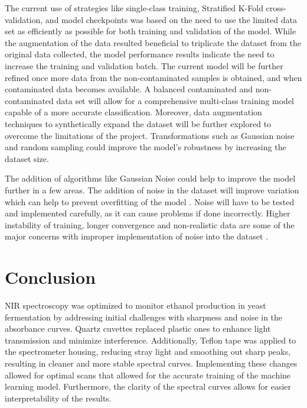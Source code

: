 \documentclass[final, 3p, 11pt]{elsarticle}
\begin{document}
The current use of strategies like single-class training, Stratified K-Fold cross-validation, and model checkpoints was based on the need to use the limited data set as efficiently as possible for both training and validation of the model. While the augmentation of the data resulted beneficial to triplicate the dataset from the original data collected, the model performance results indicate the need to increase the training and validation batch. The current model will be further refined once more data from the non-contaminated samples is obtained, and when contaminated data becomes available. A balanced contaminated and non-contaminated data set will allow for a comprehensive multi-class training model capable of a more accurate classification. Moreover, data augmentation techniques to synthetically expand the dataset will be further explored to overcome the limitations of the project. Transformations such as Gaussian noise and random sampling could improve the model’s robustness by increasing the dataset size.

The addition of algorithms like Gaussian Noise could help to improve the model further in a few areas. The addition of noise in the dataset will improve variation which can help to prevent overfitting of the model \citep{yeImprovingMachineLearning2023}. Noise will have to be tested and implemented carefully, as it can cause problems if done incorrectly. Higher instability of training, longer convergence and non-realistic data are some of the major concerns with improper implementation of noise into the dataset \citep{kuskEffectGaussianNoise2023}.


\section{Conclusion}
NIR spectroscopy was optimized to monitor ethanol production in yeast fermentation by addressing initial challenges with sharpness and noise in the absorbance curves. Quartz cuvettes replaced plastic ones to enhance light transmission and minimize interference. Additionally, Teflon tape was applied to the spectrometer housing, reducing stray light and smoothing out sharp peaks, resulting in cleaner and more stable spectral curves. Implementing these changes allowed for optimal scans that allowed for the accurate training of the machine learning model. Furthermore, the clarity of the spectral curves allows for easier interpretability of the results.
\end{document}
